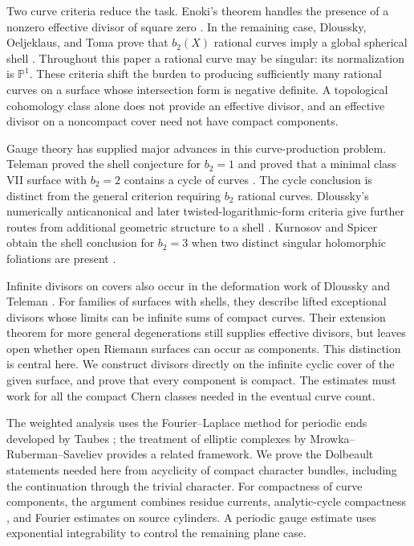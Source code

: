 \documentclass[11pt]{article}
\numberwithin{equation}{section}
\theoremstyle{definition}
\theoremstyle{remark}
\newcommand{\PP}{\mathbb P}
\begin{document}
Two curve criteria reduce the task. Enoki's theorem handles the
presence of a nonzero effective divisor of square zero
\cite{Enoki1981}. In the remaining case, Dloussky, Oeljeklaus, and
Toma prove that $b_2(X)$ rational curves imply a global spherical shell
\cite{DOT2003}. Throughout this paper a rational curve may be singular:
its normalization is $\PP^1$. These criteria shift the burden to
producing sufficiently many rational curves on a surface whose
intersection form is negative definite. A topological cohomology class
alone does not provide an effective divisor, and an effective divisor
on a noncompact cover need not have compact components.

Gauge theory has supplied major advances in this curve-production
problem. Teleman proved the shell conjecture for $b_2=1$ and proved
that a minimal class VII surface with $b_2=2$ contains a cycle of
curves \cite{Teleman2005,Teleman2010}. The cycle conclusion is distinct
from the general criterion requiring $b_2$ rational curves.
Dloussky's numerically anticanonical and later twisted-logarithmic-form
criteria give further routes from additional geometric structure to a
shell \cite{Dloussky2006,Dloussky2025}. Kurnosov and Spicer obtain the
shell conclusion for $b_2=3$ when two distinct singular holomorphic
foliations are present \cite{KurnosovSpicer2026}.

Infinite divisors on covers also occur in the deformation work of
Dloussky and Teleman \cite{DlousskyTeleman2012}. For families of
surfaces with shells, they describe lifted exceptional divisors whose
limits can be infinite sums of compact curves. Their extension theorem
for more general degenerations still supplies effective divisors, but
leaves open whether open Riemann surfaces can occur as components.
This distinction is central here. We construct divisors directly on
the infinite cyclic cover of the given surface, and prove that every
component is compact. The estimates must work for all the compact
Chern classes needed in the eventual curve count.

The weighted analysis uses the Fourier--Laplace method for periodic
ends developed by Taubes \cite{Taubes1987}; the treatment of elliptic
complexes by Mrowka--Ruberman--Saveliev \cite{MRS2014} provides a
related framework. We prove the Dolbeault statements needed here from
acyclicity of compact character bundles, including the continuation
through the trivial character. For compactness of curve components,
the argument combines residue currents, analytic-cycle compactness
\cite{Bishop1964,HarveyShiffman1974}, and Fourier estimates on source
cylinders. A periodic gauge estimate uses exponential integrability
\cite{Trudinger1967} to control the remaining plane case.
\end{document}
